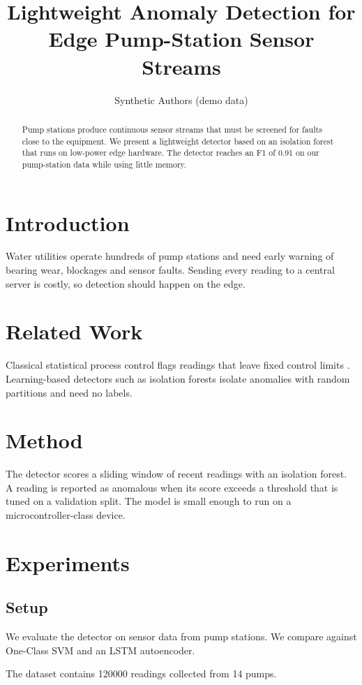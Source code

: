\documentclass{article}
\title{Lightweight Anomaly Detection for Edge Pump-Station Sensor Streams}
\author{Synthetic Authors (demo data)}
\begin{document}
\maketitle

\begin{abstract}
Pump stations produce continuous sensor streams that must be screened for faults close to the equipment. We present a lightweight detector based on an isolation forest that runs on low-power edge hardware. The detector reaches an F1 of 0.91 on our pump-station data while using little memory.
\end{abstract}

\section{Introduction}
Water utilities operate hundreds of pump stations and need early warning of bearing wear, blockages and sensor faults. Sending every reading to a central server is costly, so detection should happen on the edge.

\section{Related Work}
Classical statistical process control flags readings that leave fixed control limits \cite{shewhart}. Learning-based detectors such as isolation forests \cite{liu2008} isolate anomalies with random partitions and need no labels.

\section{Method}
The detector scores a sliding window of recent readings with an isolation forest. A reading is reported as anomalous when its score exceeds a threshold that is tuned on a validation split. The model is small enough to run on a microcontroller-class device.

\section{Experiments}
\subsection{Setup}
We evaluate the detector on sensor data from pump stations. We compare against One-Class SVM and an LSTM autoencoder.

The dataset contains 120000 readings collected from 14 pumps.
\end{document}
